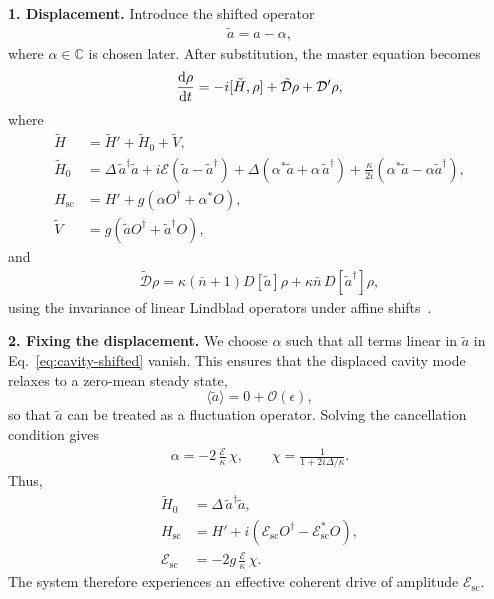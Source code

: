 \documentclass[aps,twocolumn,10pt,prl,floatfix,nofootinbib, superscriptaddress]{revtex4-2}
\newcommand{\nb}{\bar{n}}
\begin{document}
\textbf{1. Displacement.} Introduce the shifted operator
\begin{align}
\tilde{a} = a - \alpha,
\end{align}
where $\alpha \in \mathbb{C}$ is chosen later.
After substitution, the master equation becomes
\begin{align}
\dv{\rho}{t} = -i[\tilde{H},\rho] + \tilde{\mathcal{D}}\rho + \mathcal{D}'\rho,
\end{align}
where
\begin{align}
\tilde{H} &= \tilde{H}' + \tilde{H}_0 + \tilde{V},\\[2pt]
\tilde{H}_0
&= \Delta\, \tilde{a}^\dagger \tilde{a}
+ i\mathcal{E}(\tilde{a}-\tilde{a}^\dagger)
+ \Delta(\alpha^*\tilde{a} + \alpha\,\tilde{a}^\dagger)
+ \frac{\kappa}{2i}(\alpha^*\tilde{a} - \alpha \tilde{a}^\dagger),
\label{eq:cavity-shifted}\\
H_\text{sc} &= H' + g(\alpha O^\dagger + \alpha^* O),\\
\tilde{V} &= g(\tilde{a}O^\dagger + \tilde{a}^\dagger O),\label{eq:Vtilde}
\end{align}
and
\begin{align}
\tilde{\mathcal{D}}\rho
= \kappa(\nb+1)D[\tilde{a}]\rho
+ \kappa\nb\,D[\tilde{a}^\dagger]\rho,
\end{align}
using the invariance of linear Lindblad operators under affine shifts~\cite{landi_2024, schrauwen2025}.

\textbf{2. Fixing the displacement.} We choose $\alpha$ such that all terms linear in $\tilde{a}$ in Eq.~\eqref{eq:cavity-shifted} vanish.
This ensures that the displaced cavity mode relaxes to a zero-mean steady state,
\[
\langle \tilde{a} \rangle = 0 + \mathcal{O}(\epsilon),
\]
so that $\tilde{a}$ can be treated as a fluctuation operator.
Solving the cancellation condition gives
\begin{align}
\alpha = -2\,\frac{\mathcal{E}}{\kappa}\, \chi, \qquad
\chi = \frac{1}{1+2i\Delta/\kappa}.
\end{align}
Thus,
\begin{align}
\tilde{H}_0 &= \Delta\,\tilde{a}^\dagger\tilde{a},\\
H_\text{sc} &= H' + i(\mathcal{E}_\text{sc} O^\dagger - \mathcal{E}_\text{sc}^* O),\\
\mathcal{E}_\text{sc} &= -2 g\,\frac{\mathcal{E}}{\kappa}\, \chi.
\end{align}
The system therefore experiences an effective coherent drive of amplitude $\mathcal{E}_\text{sc}$.
\end{document}
